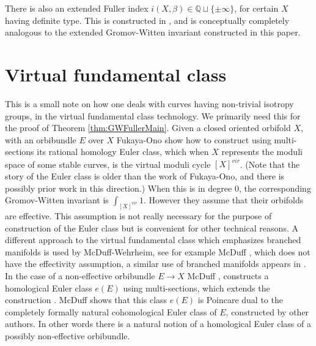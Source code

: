 \documentclass{amsart}
\numberwithin{equation}{section}
\theoremstyle{definition}
\theoremstyle{remark}
\begin{document}
\begin {appendices}
There is also an extended Fuller index $i (X, \beta) \in \mathbb{Q} \sqcup \{\pm \infty\}$, for certain $X$ having definite type.
This is constructed in \cite{citeSavelyevFuller}, and is conceptually completely analogous to the extended Gromov-Witten invariant constructed in this paper.
\section {Virtual fundamental class} \label{sec:GromovWittenprelims}
This is a small note on how one deals with curves having non-trivial isotropy groups, in the virtual fundamental class technology. We primarily need this for the proof of Theorem \ref{thm:GWFullerMain}.
Given a closed oriented orbifold $X$, with an orbibundle $E$ over $X$
Fukaya-Ono \cite{citeFukayaOnoArnoldandGW} show how to construct
using multi-sections its rational homology Euler
class, which when $X$ represents the moduli space of some stable
curves, is the virtual moduli cycle $[X] ^{vir} $.  (Note that the story of the
Euler class is older than the work of Fukaya-Ono, and there is
possibly prior work in this direction.)
When this is in degree 0, the corresponding Gromov-Witten invariant is $\int _{[X] ^{vir} } 1. $
However they  assume that their orbifolds are
effective. This assumption is not really necessary for the purpose of
construction of the Euler class but  is convenient for other technical reasons. A
different approach to the virtual fundamental class which emphasizes branched manifolds is used by
McDuff-Wehrheim, see for example McDuff
\cite{citeMcDuffNotesOnKuranishi}, which does not have
the effectivity assumption, a similar use of branched manifolds appears in
\cite{citeCieliebakRieraSalamonEquivariantmoduli}. In the case of a
non-effective orbibundle $E \to X$  McDuff \cite{citeMcDuffGroupidsMultisections}, constructs a homological
Euler class $e (E)$ using multi-sections, which  extends the construction
\cite{citeFukayaOnoArnoldandGW}.  McDuff shows that this class $e (E)$ is
Poincare dual to the completely formally natural cohomological Euler class of
$E$, constructed by other authors. In other words there is a natural notion of a
homological Euler class of a possibly non-effective orbibundle.

\end{appendices}
\end{document}
